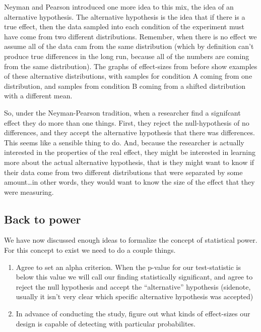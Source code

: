 \documentclass[
  letterpaper,
  DIV=11,
  numbers=noendperiod]{scrreprt}
\providecommand{\tightlist}{%
  \setlength{\itemsep}{0pt}\setlength{\parskip}{0pt}}\usepackage{longtable,booktabs,array}
\begin{document}
Neyman and Pearson introduced one more idea to this mix, the idea of an
alternative hypothesis. The alternative hypothesis is the idea that if
there is a true effect, then the data sampled into each condition of the
experiment must have come from two different distributions. Remember,
when there is no effect we assume all of the data cam from the same
distribution (which by definition can't produce true differences in the
long run, because all of the numbers are coming from the same
distribution). The graphs of effect-sizes from before show examples of
these alternative distributions, with samples for condition A coming
from one distribution, and samples from condition B coming from a
shifted distribution with a different mean.

So, under the Neyman-Pearson tradition, when a researcher find a
signifcant effect they do more than one things. First, they reject the
null-hypothesis of no differences, and they accept the alternative
hypothesis that there was differences. This seems like a sensible thing
to do. And, because the researcher is actually interested in the
properties of the real effect, they might be interested in learning more
about the actual alternative hypothesis, that is they might want to know
if their data come from two different distributions that were separated
by some amount\ldots in other words, they would want to know the size of
the effect that they were measuring.

\subsection{Back to power}\label{back-to-power}

We have now discussed enough ideas to formalize the concept of
statistical power. For this concept to exist we need to do a couple
things.

\begin{enumerate}
\def\labelenumi{\arabic{enumi}.}
\tightlist
\item
  Agree to set an alpha criterion. When the p-value for our
  test-statistic is below this value we will call our finding
  statistically significant, and agree to reject the null hypothesis and
  accept the ``alternative'' hypothesis (sidenote, usually it isn't very
  clear which specific alternative hypothesis was accepted)
\item
  In advance of conducting the study, figure out what kinds of
  effect-sizes our design is capable of detecting with particular
  probabilites.
\end{enumerate}
\end{document}
